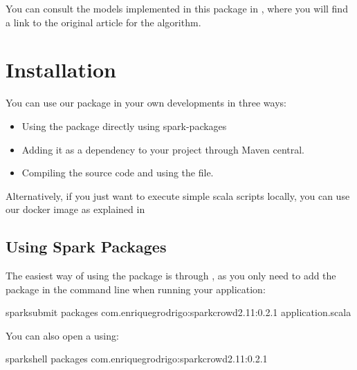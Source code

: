 \documentclass[letterpaper,10pt,english]{sphinxmanual}
\begin{document}
You can consult the models implemented in this package in {\hyperref[\detokenize{package/methods:methods}]{}}, where you will find a link to the
original article for the algorithm.


\chapter{Installation}
\label{\detokenize{usage/installation:installation}}\label{\detokenize{usage/installation:id1}}\label{\detokenize{usage/installation::doc}}
You can use our package in your own developments in three ways:
\begin{itemize}
\item {} 
Using the package directly using spark-packages

\item {} 
Adding it as a dependency to your project through Maven central.

\item {} 
Compiling the source code and using the  file.

\end{itemize}

Alternatively, if you just want to execute simple scala scripts locally,
you can use our docker image as explained in {\hyperref[\detokenize{usage/quickstart:quickstart}]{}}


\section{Using Spark Packages}
\label{\detokenize{usage/installation:using-spark-packages}}
The easiest way of using the package is through , as you only need to add the package in the command line when running your
application:

%
\begin{sphinxVerbatim}[commandchars=\\\{\}]
spark\PYGZhy{}submit \PYGZhy{}\PYGZhy{}packages com.enriquegrodrigo:spark\PYGZhy{}crowd\PYGZus{}2.11:0.2.1 application.scala
\end{sphinxVerbatim}

You can also open a  using:

%
\begin{sphinxVerbatim}[commandchars=\\\{\}]
spark\PYGZhy{}shell \PYGZhy{}\PYGZhy{}packages com.enriquegrodrigo:spark\PYGZhy{}crowd\PYGZus{}2.11:0.2.1
\end{sphinxVerbatim}
\end{document}
